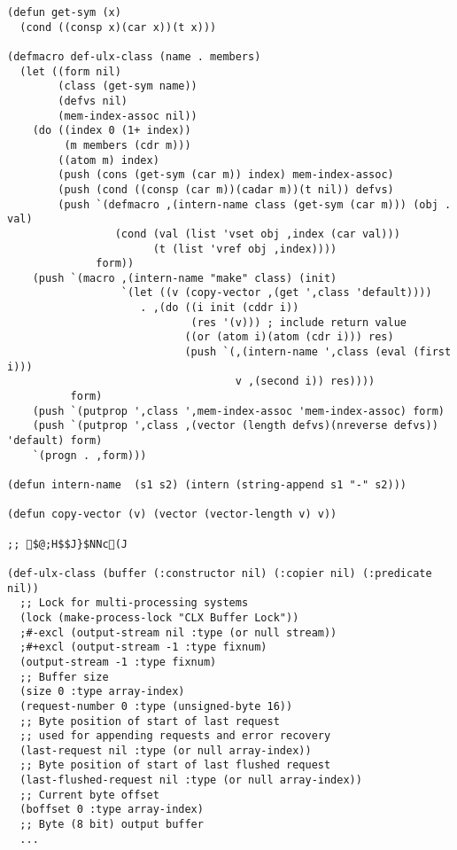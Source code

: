 \begin{small}
\begin{verbatim}
(defun get-sym (x)
  (cond ((consp x)(car x))(t x)))

(defmacro def-ulx-class (name . members)
  (let ((form nil)
        (class (get-sym name))
        (defvs nil)
        (mem-index-assoc nil))
    (do ((index 0 (1+ index))
         (m members (cdr m)))
        ((atom m) index)
        (push (cons (get-sym (car m)) index) mem-index-assoc)
        (push (cond ((consp (car m))(cadar m))(t nil)) defvs)
        (push `(defmacro ,(intern-name class (get-sym (car m))) (obj . val)
                 (cond (val (list 'vset obj ,index (car val)))
                       (t (list 'vref obj ,index))))
              form))
    (push `(macro ,(intern-name "make" class) (init)
                  `(let ((v (copy-vector ,(get ',class 'default))))
                     . ,(do ((i init (cddr i))
                             (res '(v))) ; include return value
                            ((or (atom i)(atom (cdr i))) res)
                            (push `(,(intern-name ',class (eval (first i)))
                                    v ,(second i)) res))))
          form)
    (push `(putprop ',class ',mem-index-assoc 'mem-index-assoc) form)
    (push `(putprop ',class ,(vector (length defvs)(nreverse defvs)) 'default) form)
    `(progn . ,form)))

(defun intern-name  (s1 s2) (intern (string-append s1 "-" s2)))

(defun copy-vector (v) (vector (vector-length v) v))

;; $@;H$$J}$NNc(J

(def-ulx-class (buffer (:constructor nil) (:copier nil) (:predicate nil))
  ;; Lock for multi-processing systems
  (lock (make-process-lock "CLX Buffer Lock"))
  ;#-excl (output-stream nil :type (or null stream))
  ;#+excl (output-stream -1 :type fixnum)
  (output-stream -1 :type fixnum)
  ;; Buffer size
  (size 0 :type array-index)
  (request-number 0 :type (unsigned-byte 16))
  ;; Byte position of start of last request
  ;; used for appending requests and error recovery
  (last-request nil :type (or null array-index))
  ;; Byte position of start of last flushed request
  (last-flushed-request nil :type (or null array-index))
  ;; Current byte offset
  (boffset 0 :type array-index)
  ;; Byte (8 bit) output buffer
  ...

\end{verbatim}
\end{small}

